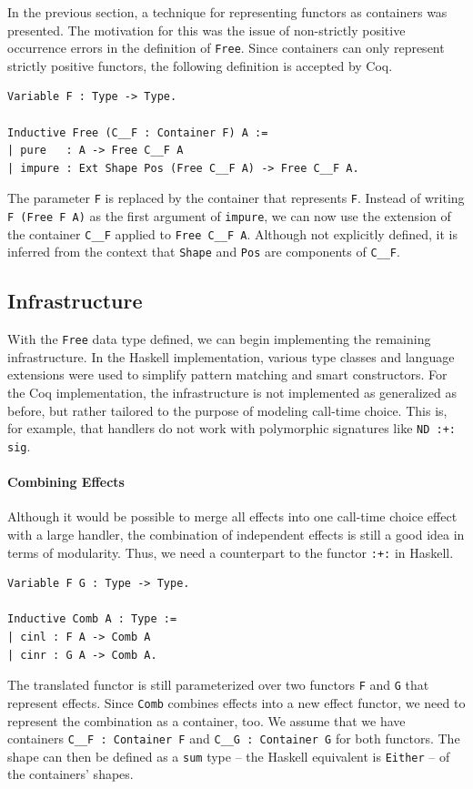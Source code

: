 \documentclass[a4paper, 11pt, fleqn, twoside, abstract=on]{scrreprt}
\newcommand{\hinl}[1]{\texttt{#1}}
\newcommand{\cinl}[1]{\texttt{#1}}
\begin{document}
In the previous section, a technique for representing functors as containers was presented.
The motivation for this was the issue of non-strictly positive occurrence errors in the definition of \cinl{Free}.
Since containers can only represent strictly positive functors, the following definition is accepted by Coq.

\begin{verbatim}
Variable F : Type -> Type.

Inductive Free (C__F : Container F) A :=
| pure   : A -> Free C__F A
| impure : Ext Shape Pos (Free C__F A) -> Free C__F A.
\end{verbatim}
\noindent
The parameter \cinl{F} is replaced by the container that represents \cinl{F}.
Instead of writing \cinl{F (Free F A)} as the first argument of \cinl{impure}, we can now use the extension of the container \cinl{C__F} applied to \cinl{Free C__F A}.
Although not explicitly defined, it is inferred from the context that \hinl{Shape} and \hinl{Pos} are components of \hinl{C__F}.

\subsection{Infrastructure}
\label{subsec:infrastructure}

With the \cinl{Free} data type defined, we can begin implementing the remaining infrastructure. 
In the Haskell implementation, various type classes and language extensions were used to simplify pattern matching and smart constructors.
For the Coq implementation, the infrastructure is not implemented as generalized as before, but rather tailored to the purpose of modeling call-time choice.
This is, for example, that handlers do not work with polymorphic signatures like \cinl{ND :+: sig}.

\paragraph{Combining Effects}
Although it would be possible to merge all effects into one call-time choice effect with a large handler, the combination of independent effects is still a good idea in terms of modularity.
Thus, we need a counterpart to the functor \hinl{:+:} in Haskell.

\begin{verbatim}
Variable F G : Type -> Type.

Inductive Comb A : Type :=
| cinl : F A -> Comb A
| cinr : G A -> Comb A.
\end{verbatim}
\noindent
The translated functor is still parameterized over two functors \cinl{F} and \cinl{G} that represent effects.
Since \cinl{Comb} combines effects into a new effect functor, we need to represent the combination as a container, too.
We assume that we have containers \cinl{C__F : Container F} and \cinl{C__G : Container G} for both functors.
The shape can then be defined as a \cinl{sum} type -- the Haskell equivalent is \hinl{Either} -- of the containers' shapes.
\end{document}
